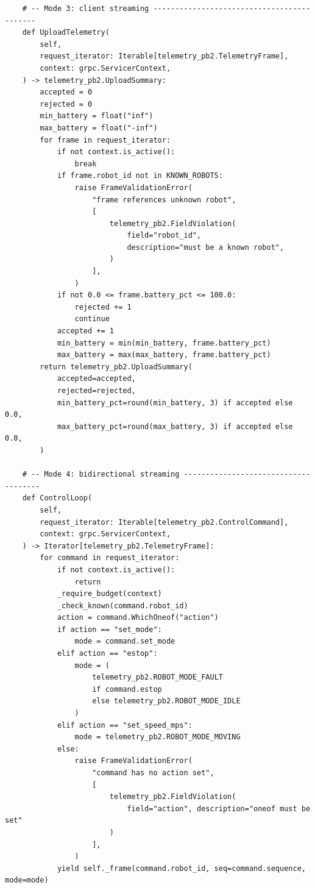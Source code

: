 \begin{verbatim}
    # -- Mode 3: client streaming -------------------------------------------
    def UploadTelemetry(
        self,
        request_iterator: Iterable[telemetry_pb2.TelemetryFrame],
        context: grpc.ServicerContext,
    ) -> telemetry_pb2.UploadSummary:
        accepted = 0
        rejected = 0
        min_battery = float("inf")
        max_battery = float("-inf")
        for frame in request_iterator:
            if not context.is_active():
                break
            if frame.robot_id not in KNOWN_ROBOTS:
                raise FrameValidationError(
                    "frame references unknown robot",
                    [
                        telemetry_pb2.FieldViolation(
                            field="robot_id",
                            description="must be a known robot",
                        )
                    ],
                )
            if not 0.0 <= frame.battery_pct <= 100.0:
                rejected += 1
                continue
            accepted += 1
            min_battery = min(min_battery, frame.battery_pct)
            max_battery = max(max_battery, frame.battery_pct)
        return telemetry_pb2.UploadSummary(
            accepted=accepted,
            rejected=rejected,
            min_battery_pct=round(min_battery, 3) if accepted else 0.0,
            max_battery_pct=round(max_battery, 3) if accepted else 0.0,
        )

    # -- Mode 4: bidirectional streaming -------------------------------------
    def ControlLoop(
        self,
        request_iterator: Iterable[telemetry_pb2.ControlCommand],
        context: grpc.ServicerContext,
    ) -> Iterator[telemetry_pb2.TelemetryFrame]:
        for command in request_iterator:
            if not context.is_active():
                return
            _require_budget(context)
            _check_known(command.robot_id)
            action = command.WhichOneof("action")
            if action == "set_mode":
                mode = command.set_mode
            elif action == "estop":
                mode = (
                    telemetry_pb2.ROBOT_MODE_FAULT
                    if command.estop
                    else telemetry_pb2.ROBOT_MODE_IDLE
                )
            elif action == "set_speed_mps":
                mode = telemetry_pb2.ROBOT_MODE_MOVING
            else:
                raise FrameValidationError(
                    "command has no action set",
                    [
                        telemetry_pb2.FieldViolation(
                            field="action", description="oneof must be set"
                        )
                    ],
                )
            yield self._frame(command.robot_id, seq=command.sequence, mode=mode)



\end{verbatim}
